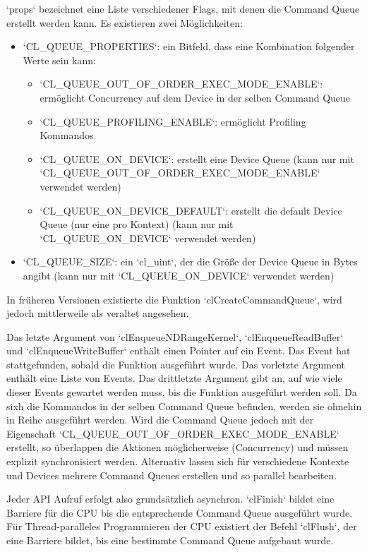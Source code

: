 		\li`props` bezeichnet eine Liste  verschiedener Flags, mit denen die \Gls{Command Queue} erstellt werden kann. Es existieren zwei Möglichkeiten:
		\begin{itemize}
			\item \li`CL_QUEUE_PROPERTIES`: ein Bitfeld, dass eine Kombination folgender Werte sein kann:
			\begin{itemize}
				\item \li`CL_QUEUE_OUT_OF_ORDER_EXEC_MODE_ENABLE`: ermöglicht Concurrency auf dem Device in der selben \Gls{Command Queue}
				\item \li`CL_QUEUE_PROFILING_ENABLE`: ermöglicht Profiling Kommandos
				\item \li`CL_QUEUE_ON_DEVICE`: erstellt eine Device Queue (kann nur mit\\ \li`CL_QUEUE_OUT_OF_ORDER_EXEC_MODE_ENABLE` verwendet werden)
				\item \li`CL_QUEUE_ON_DEVICE_DEFAULT`: erstellt die default Device Queue (nur eine pro Kontext) (kann nur mit \li`CL_QUEUE_ON_DEVICE` verwendet werden)
			\end{itemize}
			\item \li`CL_QUEUE_SIZE`: ein \li`cl_uint`, der die Größe der Device Queue in Bytes angibt (kann nur mit \li`CL_QUEUE_ON_DEVICE` verwendet werden)
		\end{itemize}
		
		In früheren Versionen existierte die Funktion \li`clCreateCommandQueue`, wird jedoch mittlerweile als veraltet angesehen.
		
		Das letzte Argument von \li`clEnqueueNDRangeKernel`, \li`clEnqueueReadBuffer` und \li`clEnqueueWriteBuffer` enthält einen Pointer auf ein Event. Das Event hat stattgefunden, sobald die Funktion ausgeführt wurde. Das vorletzte Argument enthält eine Liste von Events. Das drittletzte Argument gibt an, auf wie viele dieser Events gewartet werden muss, bis die Funktion ausgeführt werden soll. Da sixh die Kommandos in der selben \Gls{Command Queue} befinden, werden sie ohnehin in Reihe ausgeführt werden. Wird die \Gls{Command Queue} jedoch mit der Eigenschaft \li`CL_QUEUE_OUT_OF_ORDER_EXEC_MODE_ENABLE` erstellt, so überlappen die Aktionen möglicherweise (Concurrency) und müssen explizit synchronisiert werden. Alternativ lassen sich für verschiedene Kontexte und Devices mehrere \Glspl{Command Queue} erstellen und so parallel bearbeiten.
		
		Jeder \Gls{API} Aufruf erfolgt also grundsätzlich asynchron. \li`clFinish` bildet eine Barriere für die CPU bis die entsprechende \Gls{Command Queue} ausgeführt wurde. Für Thread-paralleles Programmieren der CPU existiert der Befehl \li`clFlush`, der eine Barriere bildet, bis eine bestimmte \Gls{Command Queue} aufgebaut wurde.
			
